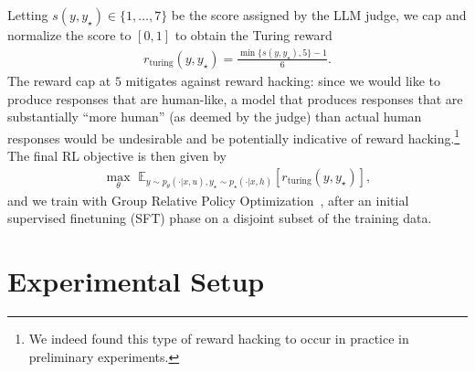\documentclass{article} %
\newcommand{\llq}[1]{{\color{cyan}[linlu: #1]}}
\begin{document}
Letting $s({y, y_\star}) \in \{1, \dots, 7\}$ be the score assigned by the LLM judge, we cap and  normalize the score to $[0,1]$ to obtain the Turing reward 
\begin{align*}
r_{\mathrm{turing}} (y, y_\star) =  \frac{\min\{s(y, y_{\star}), 5\} -1}{6}.
\end{align*}
The reward cap at $5$ mitigates against reward hacking: since we would like to produce responses that are human-like, a model that produces responses that are substantially ``more human'' (as deemed by the judge) than actual human responses would be undesirable and  be potentially indicative of reward hacking.\footnote{We indeed found this type of reward hacking to occur in practice in preliminary experiments.}
The final RL objective is then given by
\begin{align*}
    \max_\theta \,\, \mathbb{E}_{y \sim p_\theta(\cdot | x, u), y_\star \sim p_\star(\cdot | x, h)}\left[ r_{\text{turing}} (y, y_\star) \right],
\end{align*}
and we train with Group Relative Policy Optimization~\citep[GRPO;][]{shao2024deepseekmath}, after an initial supervised finetuning (SFT) phase on a disjoint subset of the training data.



\section{Experimental Setup}
\end{document}
